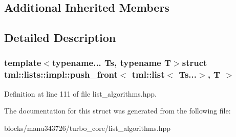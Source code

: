 \subsection*{Additional Inherited Members}


\subsection{Detailed Description}
\subsubsection*{template$<$typename... Ts, typename T$>$struct tml\+::lists\+::impl\+::push\+\_\+front$<$ tml\+::list$<$ Ts...$>$, T $>$}



Definition at line 111 of file list\+\_\+algorithms.\+hpp.



The documentation for this struct was generated from the following file\+:\begin{DoxyCompactItemize}
\item 
blocks/manu343726/turbo\+\_\+core/list\+\_\+algorithms.\+hpp\end{DoxyCompactItemize}
